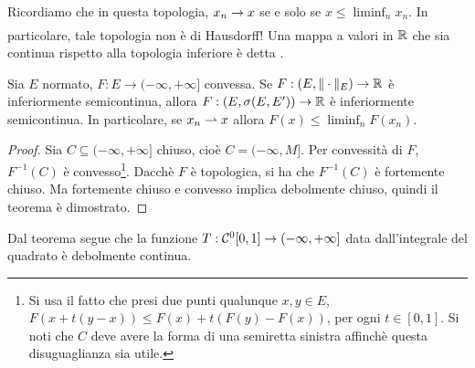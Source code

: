 Ricordiamo che in questa topologia, $x_n \underset{{}}{\rightarrow} x$ se e solo se $x \leq \liminf_n x_n$. In particolare, tale topologia non è di Hausdorff!
Una mappa a valori in $\mathbb{R}$ che sia continua rispetto alla topologia inferiore è detta .

\begin{theorem}
\label{th:weaktop_seven}
	Sia $E$ normato, $F : {E \to (-\infty, +\infty]}$ convessa.
	Se ${F : (E, \|\cdot\|_E) \to \mathbb{R}}$ è inferiormente semicontinua, allora $F : (E, \sigma(E,E')) \to \mathbb{R}$ è inferiormente semicontinua.
	In particolare, se $x_n \rightharpoonup x$ allora $F(x) \leq \liminf_n F(x_n)$.
\end{theorem}
\begin{proof}
	Sia $C \subseteq (-\infty, + \infty]$ chiuso, cioè $C=(-\infty, M]$. Per convessità di $F$, $F^{-1}(C)$ è convesso\footnote{Si usa il fatto che presi due punti qualunque $x,y \in E$, $F(x+t(y-x)) \leq F(x) + t(F(y) - F(x))$, per ogni $t \in [0,1]$. Si noti che $C$ deve avere la forma di una semiretta sinistra affinchè questa disuguaglianza sia utile.}.
	Dacchè $F$ è topologica, si ha che $F^{-1}(C)$ è fortemente chiuso. Ma fortemente chiuso e convesso implica debolmente chiuso, quindi il teorema è dimostrato.
\end{proof}

\begin{remark}
	Dal teorema segue che la funzione $T: \mathcal{C}^0[0,1] \to (-\infty,+\infty]$ data dall'integrale del quadrato è debolmente continua.
\end{remark}

